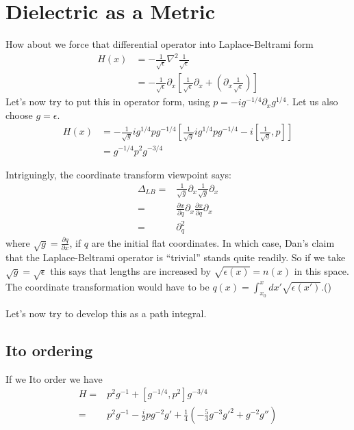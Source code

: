 \section{Dielectric as  a Metric}


How about we force that differential operator into Laplace-Beltrami form
\begin{align}
H(x) &= -\frac{1}{\sqrt{\epsilon}}\nabla^2\frac{1}{\sqrt{\epsilon}} \\
&= -\frac{1}{\sqrt{\epsilon}}\partial_x\left[\frac{1}{\sqrt{\epsilon}}\partial_x  + \left(\partial_x\frac{1 }{\sqrt{\epsilon} }\right)\right] 
\end{align}
Let's now try to put this in operator form, using $p = -ig^{-1/4}\partial_x g^{1/4}$.   Let us also choose $g = \epsilon$.
\begin{align}
H(x)&= -\frac{1}{\sqrt{g}}ig^{1/4}pg^{-1/4}\left[\frac{1}{\sqrt{g}}ig^{1/4}p g^{-1/4}  -i\left[\frac{1}{\sqrt{g}},p\right]\right]\\
&= g^{-1/4}p^2g^{-3/4}
\end{align}

Intriguingly, the coordinate transform viewpoint says:
\begin{align}
\Delta_{LB} =& \frac{1}{\sqrt{g}}\partial_x \frac{1}{\sqrt{g}}\partial_x\\
=& \frac{\partial x}{\partial q}\partial_x \frac{\partial x}{\partial q}\partial_x\\
=& \partial_q^2
\end{align}
where $\sqrt{g} = \frac{\partial q}{\partial x}$, if $q$ are the initial flat coordinates.  In which case, Dan's claim that the Laplace-Beltrami operator is ``trivial'' stands quite readily.  
So if we take $\sqrt{g} = \sqrt{\epsilon}$ this says that lengths are increased by $\sqrt{\epsilon(x)} = n(x)$ in this space.   The coordinate transformation would have to be $q(x) = \int_{x_0}^x dx' \sqrt{\epsilon(x')}$.()


Let's now try to develop this as a path integral.  
\subsection{Ito ordering}
If we Ito order we have
\begin{align}
H =& p^2 g^{-1} + [g^{-1/4},p^2]g^{-3/4}\\
=& p^2 g^{-1} -\frac{i}{2}pg^{-2}g' +\frac{1}{4}\left(-\frac{5}{4}g^{-3}g'^2 + g^{-2}g''\right)
\end{align}

